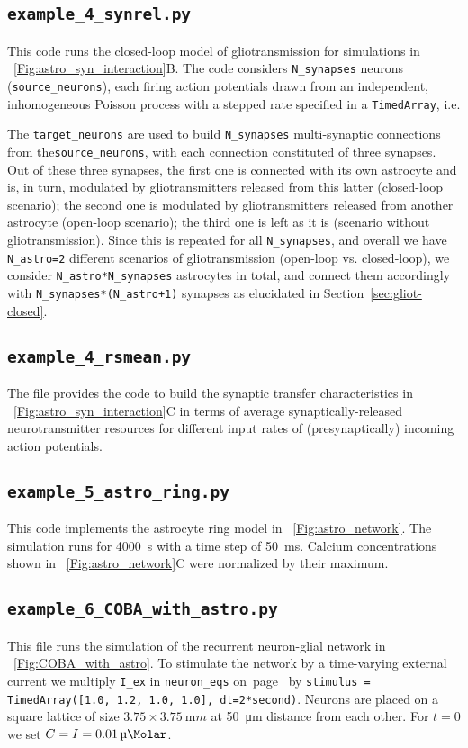 \documentclass[a4paper, 11pt]{article}
\newcommand*{\figref}[1]{\figurename~\ref{#1}}
\newcommand*{\secref}[1]{Section~\ref{#1}}
\begin{document}
\begin{appendices}
\subsection*{\lstinline|example_4_synrel.py|}
This code runs the closed-loop model of gliotransmission for simulations in \figref{Fig:astro_syn_interaction}B.
The code considers \lstinline|N_synapses| neurons (\lstinline|source_neurons|), each firing action potentials drawn from an independent, inhomogeneous Poisson process with a stepped rate specified in a \lstinline|TimedArray|, i.e.

The \lstinline|target_neurons| are used to build \lstinline|N_synapses| multi-synaptic connections from the\linebreak[4] \lstinline|source_neurons|, with each connection constituted of three synapses.
Out of these three synapses, the first one is connected with its own astrocyte and is, in turn, modulated by gliotransmitters released from this latter (closed-loop scenario);
the second one is modulated by gliotransmitters released from another astrocyte (open-loop scenario);
the third one is left as it is (scenario without gliotransmission).
Since this is repeated for all \lstinline|N_synapses|, and overall we have \lstinline|N_astro=2| different scenarios of gliotransmission (open-loop vs. closed-loop), we consider \lstinline|N_astro*N_synapses| astrocytes in total, and connect them accordingly with \lstinline|N_synapses*(N_astro+1)| synapses as elucidated in \secref{sec:gliot-closed}.  

\subsection*{\lstinline|example_4_rsmean.py|}
The file provides the code to build the synaptic transfer characteristics in \figref{Fig:astro_syn_interaction}C in terms of average synaptically-released neurotransmitter resources for different input rates of (presynaptically) incoming action potentials.

\subsection*{\lstinline|example_5_astro_ring.py|}
This code implements the astrocyte ring model in \figref{Fig:astro_network}.
The simulation runs for \SI{4000}{s} with a time step of \SI{50}{\milli s}.
Calcium concentrations shown in \figref{Fig:astro_network}C were normalized by their maximum.

\subsection*{\lstinline|example_6_COBA_with_astro.py|}
This file runs the simulation of the recurrent neuron-glial network in \figref{Fig:COBA_with_astro}.
To stimulate the network by a time-varying external current we multiply \lstinline|I_ex| in \lstinline|neuron_eqs| on~page~\pageref{eq:neuron-gi} by  \lstinline|stimulus = TimedArray([1.0, 1.2, 1.0, 1.0], dt=2*second)|.
Neurons are placed on a square lattice of size $3.75 \times \SI{3.75}{\milli m}$ at \SI{50}{\micro m} distance from each other. For $t=0$ we set $C = I = \SI{0.01}{\micro \Molar}$. 


\end{appendices}
\end{document}
